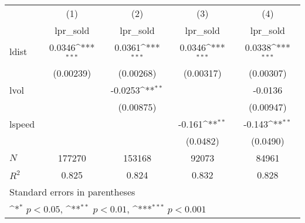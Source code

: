 {
\def\sym#1{\ifmmode^{#1}\else\(^{#1}\)\fi}
\begin{tabular}{l*{4}{c}}
\hline\hline
            &\multicolumn{1}{c}{(1)}&\multicolumn{1}{c}{(2)}&\multicolumn{1}{c}{(3)}&\multicolumn{1}{c}{(4)}\\
            &\multicolumn{1}{c}{lpr\_sold}&\multicolumn{1}{c}{lpr\_sold}&\multicolumn{1}{c}{lpr\_sold}&\multicolumn{1}{c}{lpr\_sold}\\
\hline
ldist       &      0.0346\sym{***}&      0.0361\sym{***}&      0.0346\sym{***}&      0.0338\sym{***}\\
            &   (0.00239)         &   (0.00268)         &   (0.00317)         &   (0.00307)         \\
[1em]
lvol        &                     &     -0.0253\sym{**} &                     &     -0.0136         \\
            &                     &   (0.00875)         &                     &   (0.00947)         \\
[1em]
lspeed      &                     &                     &      -0.161\sym{**} &      -0.143\sym{**} \\
            &                     &                     &    (0.0482)         &    (0.0490)         \\
\hline
\(N\)       &      177270         &      153168         &       92073         &       84961         \\
\(R^{2}\)   &       0.825         &       0.824         &       0.832         &       0.828         \\
\hline\hline
\multicolumn{5}{l}{\footnotesize Standard errors in parentheses}\\
\multicolumn{5}{l}{\footnotesize \sym{*} \(p<0.05\), \sym{**} \(p<0.01\), \sym{***} \(p<0.001\)}\\
\end{tabular}
}
